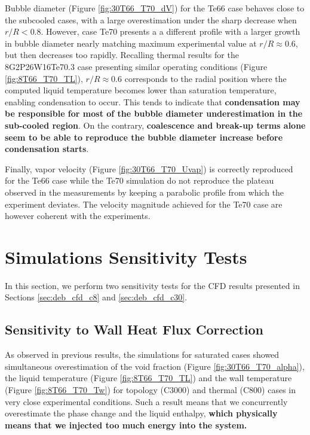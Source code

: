 Bubble diameter (Figure \ref{fig:30T66_T70_dV}) for the Te66 case behaves close to the subcooled cases, with a large overestimation under the sharp decrease when $r/R < 0.8$. However, case Te70 presents a a different profile with a larger growth in bubble diameter nearly matching maximum experimental value at $r/R \approx 0.6$, but then decreases too rapidly. Recalling thermal results for the 8G2P26W16Te70.3 case presenting similar operating conditions (Figure \ref{fig:8T66_T70_TL}), $r/R \approx 0.6$ corresponds to the radial position where the computed liquid temperature becomes lower than saturation temperature, enabling condensation to occur. This tends to indicate that \textbf{condensation may be responsible for most of the bubble diameter underestimation in the sub-cooled region}. On the contrary, \textbf{coalescence and break-up terms alone seem to be able to reproduce the bubble diameter increase before condensation starts}.

\npar

Finally, vapor velocity (Figure \ref{fig:30T66_T70_Uvap}) is correctly reproduced for the Te66 case while the Te70 simulation do not reproduce the plateau observed in the measurements by keeping a parabolic profile from which the experiment deviates. The velocity magnitude achieved for the Te70 case are however coherent with the experiments. 


\section{Simulations Sensitivity Tests}

In this section, we perform two sensitivity tests for the CFD results presented in Sections \ref{sec:deb_cfd_c8} and \ref{sec:deb_cfd_c30}. 


\subsection{Sensitivity to Wall Heat Flux Correction}


As observed in previous results, the simulations for saturated cases showed simultaneous overestimation of the void fraction (Figure \ref{fig:30T66_T70_alpha}), the liquid temperature (Figure \ref{fig:8T66_T70_TL}) and the wall temperature (Figure \ref{fig:8T66_T70_Tw}) for topology (C3000) and thermal (C800) cases in very close experimental conditions. Such a result means that we concurrently overestimate the phase change and the liquid enthalpy, \textbf{which physically means that we injected too much energy into the system.}

